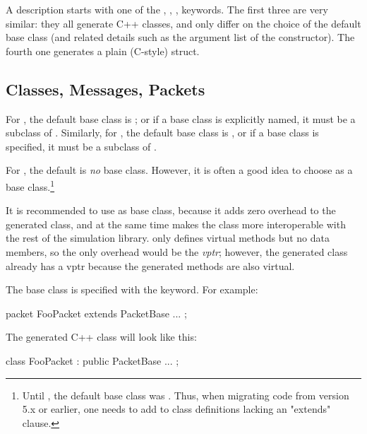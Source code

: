 A description starts with one of the , ,
,  keywords. The first three are very
similar: they all generate C++ classes, and only differ on the choice of the
default base class (and related details such as the argument list of the
constructor). The fourth one generates a plain (C-style) struct.


\subsection{Classes, Messages, Packets}
\label{sec:msg-defs:classes-messages-packets}
\label{sec:msg-defs:defining-classes} %
\label{sec:msg-defs:messages-and-packets} %
\label{sec:msg-defs:defining-messages-and-packets} %

For , the default base class is ; or if a base
class is explicitly named, it must be a subclass of . Similarly,
for , the default base class is , or if a
base class is specified, it must be a subclass of .

For , the default is \textit{no} base class. However, it is often a
good idea to choose  as a base class.\footnote{Until , the default base class was . Thus, when migrating code from
version 5.x or earlier, one needs to add  to class
definitions lacking an "extends" clause.}

\begin{note}
  It is recommended to use  as base class, because it adds zero
  overhead to the generated class, and at the same time makes the class more
  interoperable with the rest of the simulation library. 
  only defines virtual methods but no data members, so the only overhead would
  be the \textit{vptr}; however, the generated class already has a vptr because
  the generated methods are also virtual.
\end{note}

The base class is specified with the  keyword. For example:

\begin{msg}
packet FooPacket extends PacketBase
{
    ...
};
\end{msg}

The generated C++ class will look like this:

\begin{cpp}
class FooPacket : public PacketBase {
    ...
};
\end{cpp}

